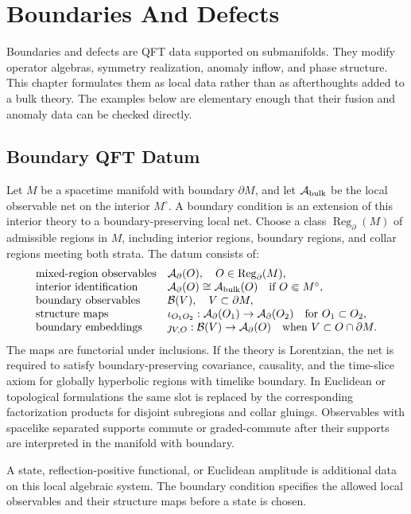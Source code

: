 \chapter{Boundaries And Defects}
\label{ch:global-boundaries-and-defects}

\ConventionsMixed

Boundaries and defects are QFT data supported on submanifolds.  They modify
operator algebras, symmetry realization, anomaly inflow, and phase structure.
This chapter formulates them as local data rather than as afterthoughts added
to a bulk theory.  The examples below are elementary enough that their fusion
and anomaly data can be checked directly.

\section{Boundary QFT Datum}

\begin{definition}
\label{def:boundary-qft-datum}
Let \(M\) be a spacetime manifold with boundary \(\partial M\), and let
\(\mathcal A_{\rm bulk}\) be the local observable net on the interior
\(M^\circ\).  A boundary condition is an extension of this interior theory to
a boundary-preserving local net.  Choose a class
\(\operatorname{Reg}_\partial(M)\) of admissible regions in \(M\), including
interior regions, boundary regions, and collar regions meeting both strata.
The datum consists of:
\[
\begin{array}{ll}
\text{mixed-region observables} &
  \mathcal A_\partial(O),\quad O\in\operatorname{Reg}_\partial(M),\\
\text{interior identification} &
  \mathcal A_\partial(O)\cong\mathcal A_{\rm bulk}(O)
  \quad\text{if }O\Subset M^\circ,\\
\text{boundary observables} &
  \mathcal B(V),\quad V\subset\partial M,\\
\text{structure maps} &
  \iota_{O_1O_2}:\mathcal A_\partial(O_1)\to
  \mathcal A_\partial(O_2)
  \quad\text{for }O_1\subset O_2,\\
\text{boundary embeddings} &
  \jmath_{V,O}:\mathcal B(V)\to\mathcal A_\partial(O)
  \quad\text{when }V\subset O\cap\partial M .
\end{array}
\]
The maps are functorial under inclusions.  If the theory is Lorentzian, the
net is required to satisfy boundary-preserving covariance, causality, and the
time-slice axiom for globally hyperbolic regions with timelike boundary.  In
Euclidean or topological formulations the same slot is replaced by the
corresponding factorization products for disjoint subregions and collar
gluings.  Observables with spacelike separated supports commute or
graded-commute after their supports are interpreted in the manifold with
boundary.

A state, reflection-positive functional, or Euclidean amplitude is additional
data on this local algebraic system.  The boundary condition specifies the
allowed local observables and their structure maps before a state is chosen.
\end{definition}


